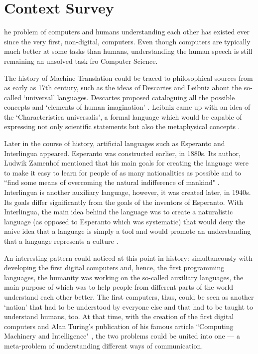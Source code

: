 \let\textcircled=\pgftextcircled
\chapter{Context Survey}
\label{chap:context-survey}

he problem of computers and humans understanding each other has existed ever since the very first, non-digital, computers. Even though computers are typically much better at some tasks than humans, understanding the human speech is still remaining an unsolved task fro Computer Science. 

The history of Machine Translation could be traced to philosophical sources from as early as 17th century, such as the ideas of Descartes and Leibniz about the so-called `universal' languages. Descartes proposed cataloguing all the possible concepts and `elements of human imagination' \cite{descartes}. Leibniz came up with an idea of the `Characteristica universalis', a formal language which would be capable of expressing not only scientific statements but also the metaphysical concepts \cite{leibniz}. 

Later in the course of history, artificial languages such as Esperanto and Interlingua appeared. Esperanto was constructed earlier, in 1880s. Its author, Ludwik Zamenhof mentioned that his main goals for creating the language were to make it easy to learn for people of as many nationalities as possible and to ``find some means of overcoming the natural indifference of mankind" \cite{zamenhof1911international}. Interlingua is another auxiliary language, however, it was created later, in 1940s. Its goals differ significantly from the goals of the inventors of Esperanto. With Interlingua, the main idea behind the language was to create a naturalistic language (as opposed to Esperanto which was systematic) that would deny the naive idea that a language is simply a tool and would promote an understanding that a language represents a culture \cite{gode1951interlingua}.

An interesting pattern could noticed at this point in history: simultaneously with developing the first digital computers and, hence, the first programming languages, the humanity was working on the so-called auxiliary languages, the main purpose of which was to help people from different parts of the world understand each other better. The first computers, thus, could be seen as another `nation' that had to be understood by everyone else and that had to be taught to understand humans, too. At that time, with the creation of the first digital computers and Alan Turing's publication of his famous article ``Computing Machinery and Intelligence" \cite{turing1950computing}, the two problems could be united into one --- a meta-problem of understanding different ways of communication.

